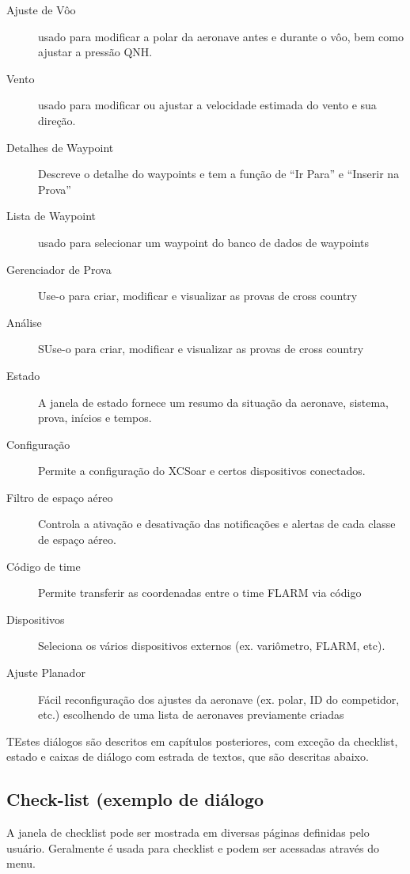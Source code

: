 \begin{description}
\item[Ajuste de Vôo] usado para modificar a polar da aeronave antes e durante o vôo, bem como ajustar a pressão QNH.
\item[Vento] usado para modificar ou ajustar a velocidade estimada do vento e sua direção. 
\item[Detalhes de Waypoint] Descreve o detalhe do waypoints e tem a função de “Ir Para” e “Inserir na Prova”
\item[Lista de Waypoint] usado para selecionar um waypoint do banco de dados de waypoints
\item[Gerenciador de Prova]Use-o para criar, modificar e visualizar as provas de cross country
\item[Análise] SUse-o para criar, modificar e visualizar as provas de cross country
\item[Estado] A janela de estado fornece um resumo da situação da aeronave, sistema, prova, inícios e tempos.
\item[Configuração] Permite a configuração do XCSoar e certos dispositivos conectados.
\item[Filtro de espaço aéreo] Controla a ativação e desativação das notificações e alertas de cada classe de espaço aéreo.
\item[Código de time] Permite transferir as coordenadas entre o time FLARM via código
\item[Dispositivos]  Seleciona os vários dispositivos externos (ex. variômetro, FLARM, etc).
\item[Ajuste Planador]  Fácil reconfiguração dos ajustes da aeronave (ex. polar, ID do competidor, etc.) escolhendo de uma lista de aeronaves previamente criadas
\end{description}

TEstes diálogos são descritos em capítulos posteriores, com exceção da checklist, estado e caixas de diálogo com estrada de textos, que são descritas abaixo.


\subsection*{Check-list (exemplo de diálogo}\label{sec:checklist}

A janela de checklist pode ser mostrada em diversas páginas definidas pelo usuário.  Geralmente é usada para checklist e podem ser acessadas através do menu.

\blink{}

